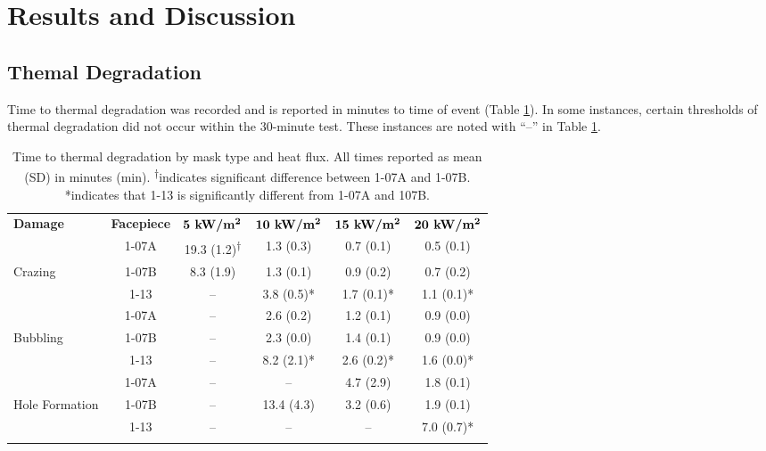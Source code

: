 \documentclass[sn-mathphys]{sn-jnl}%
\theoremstyle{thmstyleone}%
\theoremstyle{thmstyletwo}%
\theoremstyle{thmstylethree}%
\begin{document}
\section{Results and Discussion}\label{sec3}
\subsection{Themal Degradation}\label{subsec7}
Time to thermal degradation was recorded and is reported in minutes to time of event (Table \ref{tab2}). In some instances, certain thresholds of thermal degradation did not occur within the 30-minute test. These instances are noted with “--” in Table \ref{tab2}. 


\begin{table}[h!]
\begin{center}

\caption{Time to thermal degradation by mask type and heat flux. All times reported as mean (SD) in minutes (min). \textsuperscript{†}indicates significant difference between 1-07A and 1-07B. *indicates that 1-13 is significantly different from 1-07A and 107B.}\label{tab2}

    \begin{tabular}{lccccc}
      \toprule
      \textbf{Damage} & \textbf{Facepiece} & $\textbf{5 kW/m\textsuperscript{2}}$ & $\textbf{10 kW/m\textsuperscript{2}}$ & $\textbf{15 kW/m\textsuperscript{2}}$& $\textbf{20 kW/m\textsuperscript{2}}$\\
      \botrule
      & 1-07A & 19.3 (1.2)\textsuperscript{†} & 1.3 (0.3) & 0.7 (0.1) & 0.5 (0.1)\\ 
      \cmidrule{2-6}
      Crazing & 1-07B & 8.3 (1.9) & 1.3 (0.1) & 0.9 (0.2) & 0.7 (0.2)\\ 
      \cmidrule{2-6}
      & 1-13 & -- & 3.8 (0.5)* & 1.7 (0.1)* & 1.1 (0.1)*\\ 
      \botrule

        & 1-07A & -- & 2.6 (0.2) & 1.2 (0.1) & 0.9 (0.0)\\ 
      \cmidrule{2-6}
      Bubbling & 1-07B & -- & 2.3 (0.0) & 1.4 (0.1) & 0.9 (0.0)\\ 
      \cmidrule{2-6}
      & 1-13 & -- & 8.2 (2.1)* & 2.6 (0.2)* & 1.6 (0.0)*\\ 
      \botrule

        & 1-07A & -- & -- & 4.7 (2.9) & 1.8 (0.1)\\ 
      \cmidrule{2-6}
      Hole Formation & 1-07B & -- & 13.4 (4.3) & 3.2 (0.6) & 1.9 (0.1)\\ 
      \cmidrule{2-6}
      & 1-13 & -- & -- & -- & 7.0 (0.7)*\\ 
      \botrule
     
    \end{tabular}
  
  \end{center}
\end{table}
\end{document}
